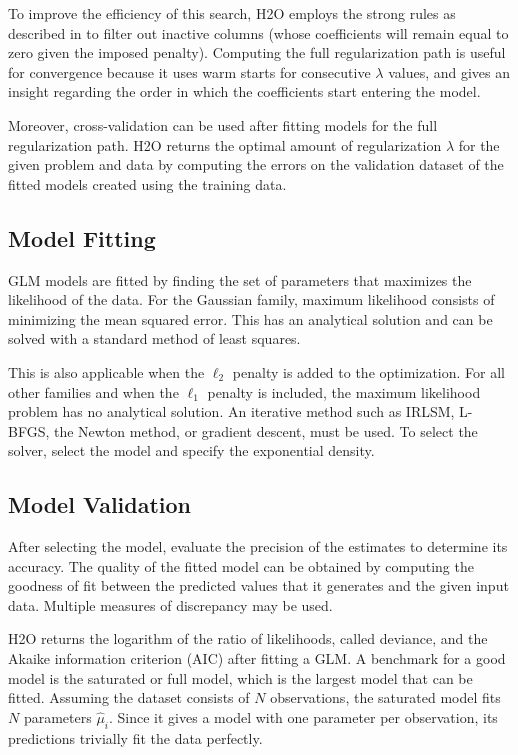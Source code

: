 To improve the efficiency of this search, 
H2O employs the strong rules as described in  to filter out inactive columns (whose coefficients will remain equal to zero given the imposed penalty). Computing the full regularization path is useful for convergence because it uses warm starts for consecutive $\lambda$ values, and gives an insight regarding the order in which the coefficients start entering the model. 

Moreover, cross-validation can be used after fitting models for the full regularization path. H2O returns the optimal amount of regularization $\lambda$ for the given problem and data by computing the errors on the validation dataset of the fitted models created using the training data.

\newpage
\subsection{Model Fitting}
GLM models are fitted by finding the set of parameters that maximizes the likelihood of the data. For the Gaussian family, maximum likelihood consists of minimizing the mean squared error. This has an analytical solution and can be solved with a standard method of least squares. 

This is also applicable when the $\ell_2$ penalty is added to the optimization.  For all other families and when the $\ell_1$ penalty is included, the maximum likelihood problem has no analytical solution. An iterative method such as IRLSM, L-BFGS, the Newton method, or gradient descent, must be used. To select the solver, select the model and specify the exponential density. 


\subsection{Model Validation}

After selecting the model, evaluate the precision of the estimates to determine its accuracy. The quality of the fitted model can be obtained by computing the goodness of fit between the predicted values that it generates and the given input data. Multiple measures of discrepancy may be used. 
\nowidow[3]

H2O returns the logarithm of the ratio of likelihoods, called deviance, and the Akaike information criterion (AIC) after fitting a GLM. A benchmark for a good model is the saturated or full model, which is the largest model that can be fitted. Assuming the dataset consists of $N$ observations, the saturated model fits $N$ parameters $\hat{\mu}_i$. Since it gives a model with one parameter per observation, its predictions trivially fit the data perfectly.

